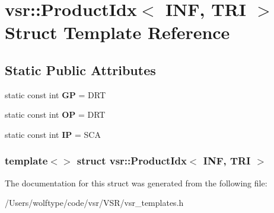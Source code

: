 \hypertarget{structvsr_1_1_product_idx_3_01_i_n_f_00_01_t_r_i_01_4}{\section{vsr\-:\-:Product\-Idx$<$ I\-N\-F, T\-R\-I $>$ Struct Template Reference}
\label{structvsr_1_1_product_idx_3_01_i_n_f_00_01_t_r_i_01_4}
}
\subsection*{Static Public Attributes}
\begin{DoxyCompactItemize}
\item 
\hypertarget{structvsr_1_1_product_idx_3_01_i_n_f_00_01_t_r_i_01_4_aadcf8e7964c0edfb7a3ece1e96afa81c}{static const int {\bfseries G\-P} = D\-R\-T}\label{structvsr_1_1_product_idx_3_01_i_n_f_00_01_t_r_i_01_4_aadcf8e7964c0edfb7a3ece1e96afa81c}

\item 
\hypertarget{structvsr_1_1_product_idx_3_01_i_n_f_00_01_t_r_i_01_4_a558f85f13ff6fc303556acc3d1db9536}{static const int {\bfseries O\-P} = D\-R\-T}\label{structvsr_1_1_product_idx_3_01_i_n_f_00_01_t_r_i_01_4_a558f85f13ff6fc303556acc3d1db9536}

\item 
\hypertarget{structvsr_1_1_product_idx_3_01_i_n_f_00_01_t_r_i_01_4_a5ebf27f6eaa3c6cec7ede456e70ce4e4}{static const int {\bfseries I\-P} = S\-C\-A}\label{structvsr_1_1_product_idx_3_01_i_n_f_00_01_t_r_i_01_4_a5ebf27f6eaa3c6cec7ede456e70ce4e4}

\end{DoxyCompactItemize}
\subsubsection*{template$<$$>$ struct vsr\-::\-Product\-Idx$<$ I\-N\-F, T\-R\-I $>$}



The documentation for this struct was generated from the following file\-:\begin{DoxyCompactItemize}
\item 
/\-Users/wolftype/code/vsr/\-V\-S\-R/vsr\-\_\-templates.\-h\end{DoxyCompactItemize}

